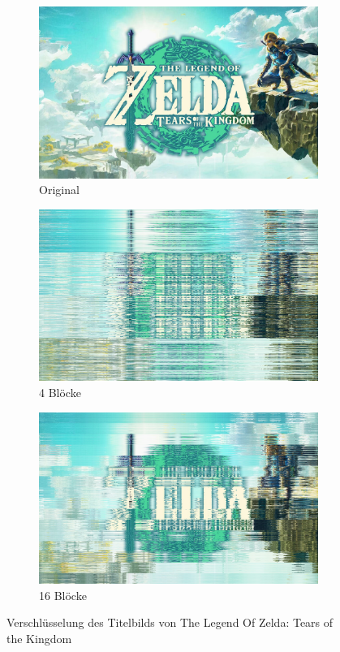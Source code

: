 \begin{figure}[h]
    \centering
    \begin{subfigure}[b]{0.3\textwidth}
        \centering
        \includegraphics[width=\textwidth]{./img/tloztotk.png}
        \caption{Original}
    \end{subfigure}
    \hfill
    \begin{subfigure}[b]{0.3\textwidth}
        \centering
        \includegraphics[width=\textwidth]{./img/cipher/04_tloztotk.png}
        \caption{4 Blöcke}
    \end{subfigure}
    \hfill
    \begin{subfigure}[b]{0.3\textwidth}
        \centering
        \includegraphics[width=\textwidth]{./img/cipher/16_tloztotk.png}
        \caption{16 Blöcke}
    \end{subfigure}
    \caption{Verschlüsselung des Titelbilds von The Legend Of Zelda: Tears of the Kingdom}
    \label{fig:permutation_encryption_demo}
\end{figure}
